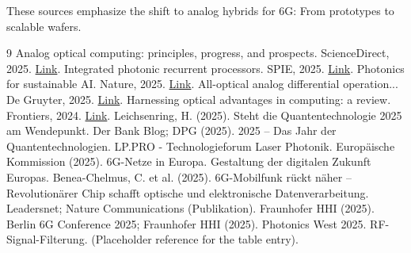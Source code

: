 	These sources emphasize the shift to analog hybrids for 6G: From prototypes to scalable wafers.
	\begin{thebibliography}{9}
	 Analog optical computing: principles, progress, and prospects. ScienceDirect, 2025. \href{https://www.sciencedirect.com/science/article/abs/pii/S0030399225018110}{Link}.
	 Integrated photonic recurrent processors. SPIE, 2025. \href{https://www.spiedigitallibrary.org/journals/advanced-photonics/volume-7/issue-5/054003/Integrated-photonic-recurrent-processors/10.1117/1.AP.7.5.054003.full}{Link}.
	 Photonics for sustainable AI. Nature, 2025. \href{https://www.nature.com/articles/s42005-025-02300-0}{Link}.
	 All-optical analog differential operation... De Gruyter, 2025. \href{https://www.degruyter.com/document/doi/10.1515/nanoph-2024-0540/html}{Link}.
	 Harnessing optical advantages in computing: a review. Frontiers, 2024. \href{https://www.frontiersin.org/journals/physics/articles/10.3389/fphy.2024.1379051/full}{Link}.
	 Leichsenring, H. (2025). Steht die Quantentechnologie 2025 am Wendepunkt. Der Bank Blog; DPG (2025). 2025 – Das Jahr der Quantentechnologien. LP.PRO - Technologieforum Laser Photonik.
	 Europäische Kommission (2025). 6G-Netze in Europa. Gestaltung der digitalen Zukunft Europas.
	 Benea-Chelmus, C. et al. (2025). 6G-Mobilfunk rückt näher – Revolutionärer Chip schafft optische und elektronische Datenverarbeitung. Leadersnet; Nature Communications (Publikation).
	 Fraunhofer HHI (2025). Berlin 6G Conference 2025; Fraunhofer HHI (2025). Photonics West 2025.
	 RF-Signal-Filterung. (Placeholder reference for the table entry).
\end{thebibliography}	